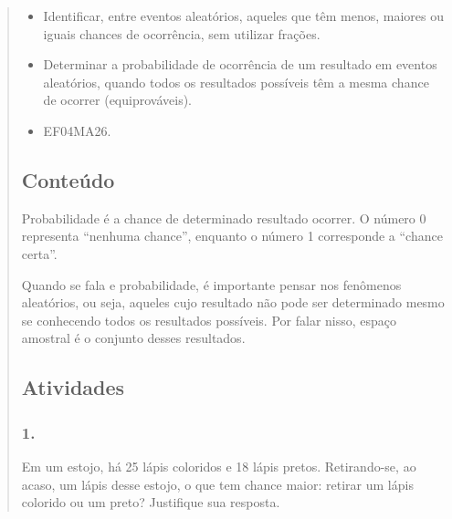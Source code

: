 \begin{enumerate}
\begin{escolha}
\begin{enumerate}
\begin{itemize}
\begin{itemize}
\begin{escolha}
\begin{quote}
\begin{escolha}

\begin{itemize}
\item Identificar, entre eventos aleatórios, aqueles que têm menos, maiores ou
iguais chances de ocorrência, sem utilizar frações.
\item Determinar a probabilidade de ocorrência de um resultado em eventos
aleatórios, quando todos os resultados possíveis têm a mesma chance de
ocorrer (equiprováveis).
\end{itemize}


\begin{itemize}
\item EF04MA26.
\end{itemize}

\subsection{Conteúdo}\label{conteuxfado-6}

Probabilidade é a chance de determinado
resultado ocorrer. O número 0 representa ``nenhuma chance'', enquanto o número 1
corresponde a ``chance certa''.

Quando se fala e probabilidade, é importante pensar nos fenômenos aleatórios, ou seja, aqueles cujo resultado não pode ser determinado mesmo se conhecendo todos os resultados possíveis. Por falar nisso, espaço amostral é o conjunto desses resultados.

\subsection{Atividades}\label{atividades-6}

\subsubsection{1.}\label{section-78}

Em um estojo, há 25 lápis coloridos e 18 lápis pretos. Retirando-se, ao
acaso, um lápis desse estojo, o que tem chance maior: retirar um lápis
colorido ou um preto? Justifique sua resposta.




\end{escolha}
\end{quote}
\end{escolha}
\end{itemize}
\end{itemize}
\end{enumerate}
\end{escolha}
\end{enumerate}
